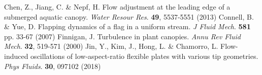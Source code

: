 \documentclass[lineno,authoryear]{FLO_v1}%
\theoremstyle{definition}
\begin{document}
\begin{Backmatter}
\begin{thebibliography}{}
Chen, Z., Jiang, C. \& Nepf, H. Flow adjustment at the leading edge of a submerged aquatic canopy. {\em Water Resour Res}. \textbf{49}, 5537-5551 (2013)
Connell, B. \& Yue, D. Flapping dynamics of a flag in a uniform stream. {\em J Fluid Mech}. \textbf{581} pp. 33-67 (2007)
Finnigan, J. Turbulence in plant canopies. {\em Annu Rev Fluid Mech}. \textbf{32}, 519-571 (2000)
Jin, Y., Kim, J., Hong, L. \& Chamorro, L. Flow-induced oscillations of low-aspect-ratio flexible plates with various tip geometries. {\em Phys Fluids}. \textbf{30}, 097102 (2018)

\end{thebibliography}


\end{Backmatter}
\end{document}
